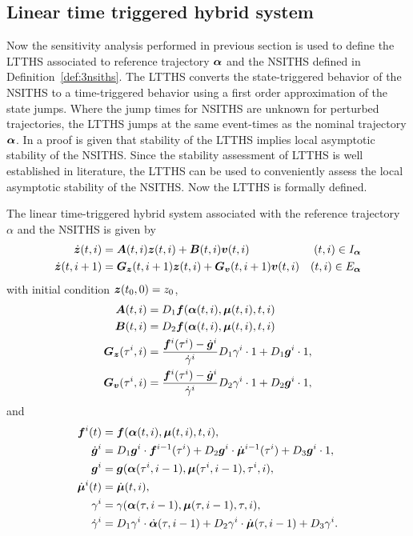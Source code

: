 \documentclass[../DC2017114Bouma.tex]{subfiles}
\begin{document}
\subsection{Linear time triggered hybrid system}
Now the sensitivity analysis performed in previous section is used to define the LTTHS associated to reference trajectory $\boldsymbol{\alpha}$ and the NSITHS defined in Definition~\ref{def:3nsiths}. The LTTHS converts the state-triggered behavior of the NSITHS to a time-triggered behavior using a first order approximation of the state jumps. Where the jump times for NSITHS are unknown for perturbed trajectories, the LTTHS jumps at the same event-times as the nominal trajectory $\boldsymbol{\alpha}$. In \cite{Rijnen2017} a proof is given that stability of the LTTHS implies local asymptotic stability of the NSITHS. Since the stability assessment of LTTHS is well established in literature, the LTTHS can be used to conveniently assess the local asymptotic stability of the NSITHS. Now the LTTHS is formally defined.
\begin{mydef}[LTTHS]\label{def:3ltths}
The linear time-triggered hybrid system associated with the reference trajectory $\alpha$ and the NSITHS is given by
\begin{align}
\dot{{\boldsymbol{z}}}(t,i) &= {\boldsymbol{A}}(t,i){\boldsymbol{z}}(t,i) + {\boldsymbol{B}}(t,i){\boldsymbol{v}}(t,i) &(t,i)\in I_{\boldsymbol{\alpha}}\\
\dot{{\boldsymbol{z}}}(t,i+1) &= {\boldsymbol{G}}_{{\boldsymbol{z}}}(t,i+1){\boldsymbol{z}}(t,i) +  {\boldsymbol{G}}_{{\boldsymbol{v}}}(t,i+1){\boldsymbol{v}}(t,i) &(t,i)\in E_{\boldsymbol{\alpha}}
\end{align}
with initial condition ${\boldsymbol{z}}(t_0,0)=z_0$,
\begin{align}
{\boldsymbol{A}}(t,i) &= D_1{\boldsymbol{f}}(\boldsymbol{\alpha}(t,i),\boldsymbol{\mu}(t,i),t,i)\\
{\boldsymbol{B}}(t,i) &= D_2{\boldsymbol{f}}(\boldsymbol{\alpha}(t,i),\boldsymbol{\mu}(t,i),t,i)\\
{\boldsymbol{G}}_{{\boldsymbol{z}}}(\tau^i,i) & = \frac{{\boldsymbol{f}}^i(\tau^i) - \dot{{\boldsymbol{g}}}^i}{\dot{\gamma}^i}D_1\gamma^i\cdot 1 + D_1{\boldsymbol{g}}^i\cdot 1,\\
{\boldsymbol{G}}_{{\boldsymbol{v}}}(\tau^i,i) & = \frac{{\boldsymbol{f}}^i(\tau^i) - \dot{{\boldsymbol{g}}}^i}{\dot{\gamma}^i}D_2\gamma^i\cdot 1 + D_2{\boldsymbol{g}}^i\cdot 1,
\end{align}
and
\begin{align}
{\boldsymbol{f}}^i(t) &= {\boldsymbol{f}}(\boldsymbol{\alpha}(t,i),\boldsymbol{\mu}(t,i),t,i),\\
\dot{{\boldsymbol{g}}}^i &= D_1{\boldsymbol{g}}^i\cdot {\boldsymbol{f}}^{i-1}(\tau^i) + D_2{\boldsymbol{g}}^i\cdot \dot{\boldsymbol{\mu}}^{i-1}(\tau^i) + D_3{\boldsymbol{g}}^i\cdot 1,\\
{\boldsymbol{g}}^i &= {\boldsymbol{g}}(\boldsymbol{\alpha}(\tau^i,i-1),\boldsymbol{\mu}(\tau^i,i-1),\tau^i,i),\\
\dot{\boldsymbol{\mu}}^{i}(t) &= \dot{\boldsymbol{\mu}}(t,i),\\
\gamma^i &= \gamma(\boldsymbol{\alpha}(\tau,i-1),\boldsymbol{\mu}(\tau,i-1),\tau,i),\\
\dot{\gamma}^i &= D_1\gamma^i\cdot\dot{\boldsymbol{\alpha}}(\tau,i-1) + D_2\gamma^i\cdot\dot{\boldsymbol{\mu}}(\tau,i-1) + D_3\gamma^i.
\end{align}
\end{mydef}
\end{document}
